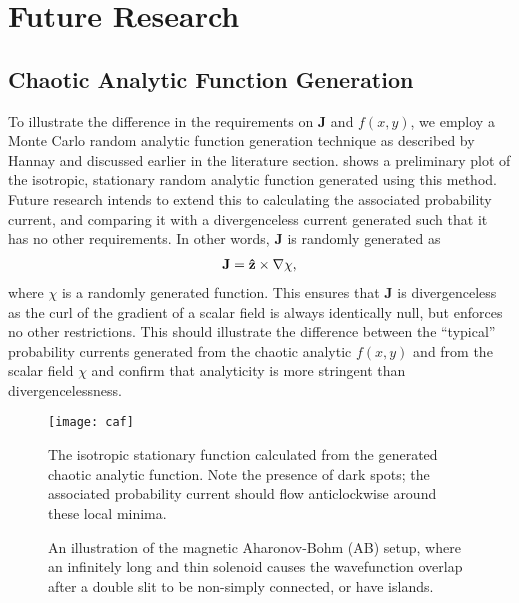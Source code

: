 \section{Future Research}
\label{sec:future}

\subsection{Chaotic Analytic Function Generation}

To illustrate the difference in the requirements on $\mathbf{J}$ and $f(x,y)$,
we employ a Monte Carlo random analytic function generation technique as
described by Hannay \cite{hannay} and discussed earlier in the literature
section.  shows a preliminary plot of the isotropic, stationary
random analytic function generated using this method. Future research intends to
extend this to calculating the associated probability current, and comparing it
with a divergenceless current generated such that it has no other requirements.
In other words, $\mathbf{J}$ is randomly generated as
\begin{align}
    \mathbf{J} = \mathbf{\hat z } \times \nabla \chi,
\end{align}
where $\chi$ is a randomly generated function. This ensures that $\mathbf{J}$
is divergenceless as the curl of the gradient of a scalar field is always
identically null, but enforces no other restrictions. This should illustrate the
difference between the ``typical'' probability currents generated from the
chaotic analytic $f(x,y)$ and from the scalar field $\chi$ and confirm that
analyticity is more stringent than divergencelessness.

\begin{figure}
    \centering
    \begin{minipage}{0.45\linewidth}
        \centering
        \texttt{[image: caf]}
        \caption{The isotropic stationary function calculated from the generated
            chaotic analytic function. Note the presence of dark spots; the
            associated probability current should flow anticlockwise around these local
            minima.}
        \label{fig:caf}
    \end{minipage}
    \begin{minipage}{0.45\linewidth}
        \centering
        \def\svgwidth{\linewidth}
        
        \caption{An illustration of the magnetic Aharonov-Bohm (AB) setup, where an
            infinitely long and thin solenoid causes the wavefunction overlap after
            a double slit to be non-simply connected, or have islands.}
        \label{fig:magnetic-ab}
    \end{minipage}
\end{figure}

